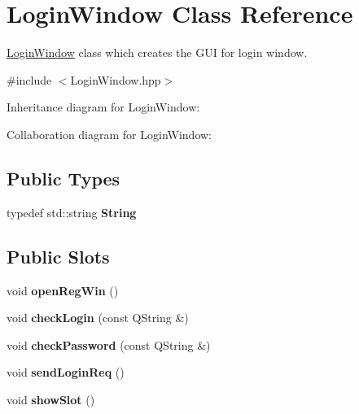 \hypertarget{classLoginWindow}{}\section{Login\+Window Class Reference}
\label{classLoginWindow}


\hyperlink{classLoginWindow}{Login\+Window} class which creates the G\+UI for login window.  




{\ttfamily \#include $<$Login\+Window.\+hpp$>$}



Inheritance diagram for Login\+Window\+:


Collaboration diagram for Login\+Window\+:
\subsection*{Public Types}
\begin{DoxyCompactItemize}
\item 
typedef std\+::string {\bfseries String}\hypertarget{classLoginWindow_a9d5191a38906ea9c5375c1029cfd9d4d}{}\label{classLoginWindow_a9d5191a38906ea9c5375c1029cfd9d4d}

\end{DoxyCompactItemize}
\subsection*{Public Slots}
\begin{DoxyCompactItemize}
\item 
void {\bfseries open\+Reg\+Win} ()\hypertarget{classLoginWindow_abe06ec97d678045c810e2ac6033ee9c0}{}\label{classLoginWindow_abe06ec97d678045c810e2ac6033ee9c0}

\item 
void {\bfseries check\+Login} (const Q\+String \&)\hypertarget{classLoginWindow_a01edb22f1bf6dfdf3bd0811f6c878330}{}\label{classLoginWindow_a01edb22f1bf6dfdf3bd0811f6c878330}

\item 
void {\bfseries check\+Password} (const Q\+String \&)\hypertarget{classLoginWindow_ad5a16b9244af77d36f98a4f48d3d423d}{}\label{classLoginWindow_ad5a16b9244af77d36f98a4f48d3d423d}

\item 
void {\bfseries send\+Login\+Req} ()\hypertarget{classLoginWindow_ac6dc94a63017e4e500b7ec0cbd4cac33}{}\label{classLoginWindow_ac6dc94a63017e4e500b7ec0cbd4cac33}

\item 
void {\bfseries show\+Slot} ()\hypertarget{classLoginWindow_a8e8dfb5d47f4771d469be1d764aa8509}{}\label{classLoginWindow_a8e8dfb5d47f4771d469be1d764aa8509}

\end{DoxyCompactItemize}
